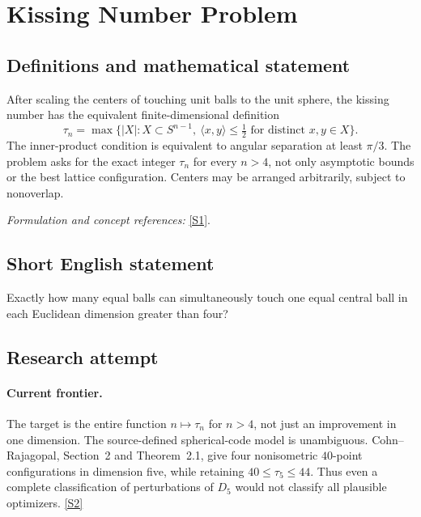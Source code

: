 \documentclass[11pt,a4paper]{article}
\newcommand{\sref}[2]{\hyperlink{source:#1:#2}{[S#2]}}
\newif\ifshowcatalogue
\newcommand{\cataloguescope}[1]{\ifshowcatalogue
 \paragraph{Exact scope in the supplied catalogue.}
 \begin{quote}\small #1\end{quote}\fi}
\numberwithin{equation}{section}
\begin{document}
\setcounter{section}{0}
\clearpage
\section*{\texorpdfstring{Kissing Number Problem}{Kissing Number Problem}}\label{statement}
\subsection{Definitions and mathematical statement}
After scaling the centers of touching unit balls to the unit sphere, the kissing number has the equivalent finite-dimensional definition
\[
 \tau_n=\max\bigl\{|X|:X\subset S^{n-1},\ \langle x,y\rangle\le\tfrac12
                                  \text{ for distinct }x,y\in X\bigr\}.
\]
The inner-product condition is equivalent to angular separation at least $\pi/3$. The problem asks for the exact integer $\tau_n$ for every $n>4$, not only asymptotic bounds or the best lattice configuration. Centers may be arranged arbitrarily, subject to nonoverlap.
\par\smallskip\textit{Formulation and concept references:} \sref{statement}{1}.
\cataloguescope{For every integer n > 4, determine the exact kissing number tau\_n: the maximum number of pairwise nonoverlapping unit balls in Euclidean R\textasciicircum{}n that can touch a central unit ball of the same radius.}
\subsection{Short English statement}
Exactly how many equal balls can simultaneously touch one equal central ball in each Euclidean dimension greater than four?
\subsection{Research attempt}

\paragraph{Current frontier.}
The target is the entire function $n\mapsto\tau_n$ for $n>4$, not just
an improvement in one dimension. The source-defined spherical-code model
is unambiguous. Cohn--Rajagopal, Section~2 and Theorem~2.1, give four
nonisometric $40$-point configurations in dimension five, while retaining
$40\leq\tau_5\leq44$. Thus even a complete classification of perturbations
of $D_5$ would not classify all plausible optimizers. \sref{statement}{2}
\end{document}
